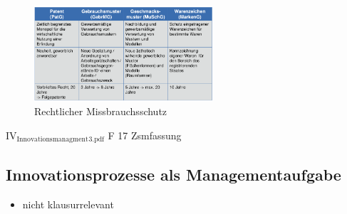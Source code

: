 \documentclass[11pt]{article}
\begin{document}
\begin{figure}[htbp]
\centering
\includegraphics[width=250px]{./pictures/inmiss.png}
\caption{Rechtlicher Missbrauchsschutz}
\end{figure} 

IV\(_{\text{Innovationsmanagment}}\)\(_{\text{3.pdf}}\) F 17 Zsmfassung
\subsection{Innovationsprozesse als Managementaufgabe}
\label{sec:org9e1c5ce}
\begin{itemize}
\item nicht klausurrelevant
\end{itemize}
\end{document}
